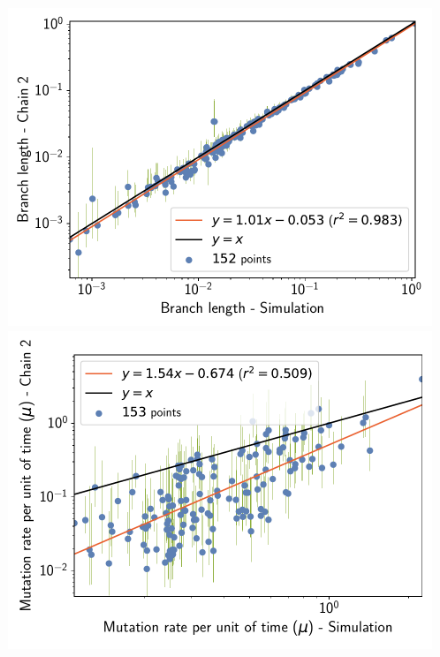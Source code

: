 \documentclass{article}
\begin{document}
	\begin{figure}[H]
		\centering
		\begin{minipage}{0.32\linewidth}
			\includegraphics[width=\linewidth, page=1]{simulations/SimuGeo_SiteMutSelBranchNe_BranchCorrelation_Log10BranchLength}
		\end{minipage} \hfill
		\begin{minipage}{0.32\linewidth}
			\includegraphics[width=\linewidth, page=1]{simulations/SimuGeo_SiteMutSelBranchNe_BranchCorrelation_LogMutationRatePerTime}
		\end{minipage} \hfill
		\begin{minipage}{0.32\linewidth}

\end{minipage}
\end{figure}
\end{document}
